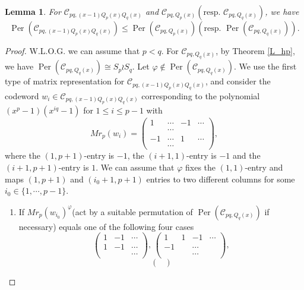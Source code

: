 \documentclass[journal,12pt,onecolumn]{IEEEtran}
\newtheorem{lemma}{Lemma}
\begin{document}
 
\begin{lemma}\label{inclu_per}
    For $\mathcal{C}_{pq,(x-1)Q_p(x)Q_q(x)}$ and $\mathcal{C}_{pq,Q_p(x)}(\text{resp. }\mathcal{C}_{pq,Q_q(x)})$, we have
    \[
        \operatorname{Per}(\mathcal{C}_{pq,(x-1)Q_p(x)Q_q(x)})\leqslant \operatorname{Per}(\mathcal{C}_{pq,Q_p(x)})\left(\text{resp. }\operatorname{Per}(\mathcal{C}_{pq,Q_q(x)})\right). 
    \]
\end{lemma}
\begin{proof}
    W.L.O.G. we can assume that $p<q$. For $\mathcal{C}_{pq,Q_q(x)}$, by Theorem \ref{L_hp}, we have $\operatorname{Per}(\mathcal{C}_{pq,Q_q(x)})\cong S_p \wr S_q$. Let $\varphi\notin \operatorname{Per}(\mathcal{C}_{pq,Q_q(x)})$. We use the first type of matrix representation for $\mathcal{C}_{pq,(x-1)Q_p(x)Q_q(x)}$, and consider the codeword $w_i\in\mathcal{C}_{pq,(x-1)Q_p(x)Q_q(x)}$ corresponding to the polynomial $(x^p-1)(x^{iq}-1)$ for $1\le i\le p-1$ with
    \[
        Mr_p(w_i) = \begin{pmatrix}
            1 & \cdots & -1 & \cdots \\
              & \cdots &  & \\
            -1 & \cdots & 1 & \cdots \\
              & \cdots &  & 
        \end{pmatrix},
    \]
    where the $(1,p+1)$-entry is $-1$, the $(i+1,1)$-entry is $-1$ and the $(i+1,p+1)$-entry is $1$. We can assume that $\varphi$ fixes the $(1,1)$-entry and maps $(1,p+1)$ and $(i_0+1,p+1)$ entries to two different columns for some $i_0\in \{1,\cdots,p-1\}$. 
    \begin{enumerate}
        \item If $Mr_p(w_{i_0})^\varphi$(act by a suitable permutation of $\operatorname{Per}(\mathcal{C}_{pq,Q_q(x)})$ if necessary) equals one of the following four cases
        \[
            \begin{pmatrix}
                1 & -1 & \cdots \\
                1 & -1 & \cdots \\
                  &  & \cdots 
            \end{pmatrix},\,\begin{pmatrix}
                1 & 1 & -1 & \cdots \\
                -1 & & \cdots & \\
                  &  & \cdots & 
            \end{pmatrix},
        \]
        \[
            \begin{pmatrix}

\end{pmatrix}\]
\end{enumerate}
\end{proof}
\end{document}

